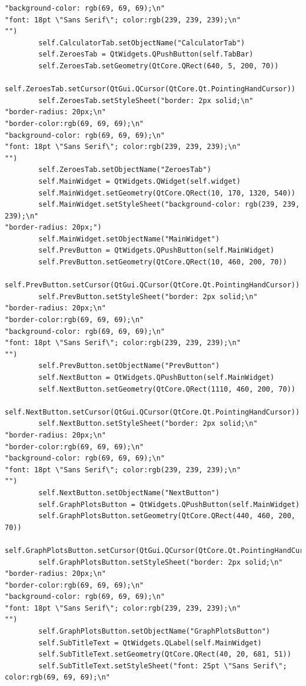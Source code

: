 \documentclass{article}
\begin{document}
\begin{lstlisting}
"background-color: rgb(69, 69, 69);\n"
"font: 18pt \"Sans Serif\"; color:rgb(239, 239, 239);\n"
"")
        self.CalculatorTab.setObjectName("CalculatorTab")
        self.ZeroesTab = QtWidgets.QPushButton(self.TabBar)
        self.ZeroesTab.setGeometry(QtCore.QRect(640, 5, 200, 70))
        self.ZeroesTab.setCursor(QtGui.QCursor(QtCore.Qt.PointingHandCursor))
        self.ZeroesTab.setStyleSheet("border: 2px solid;\n"
"border-radius: 20px;\n"
"border-color:rgb(69, 69, 69);\n"
"background-color: rgb(69, 69, 69);\n"
"font: 18pt \"Sans Serif\"; color:rgb(239, 239, 239);\n"
"")
        self.ZeroesTab.setObjectName("ZeroesTab")
        self.MainWidget = QtWidgets.QWidget(self.widget)
        self.MainWidget.setGeometry(QtCore.QRect(10, 170, 1320, 540))
        self.MainWidget.setStyleSheet("background-color: rgb(239, 239, 239);\n"
"border-radius: 20px;")
        self.MainWidget.setObjectName("MainWidget")
        self.PrevButton = QtWidgets.QPushButton(self.MainWidget)
        self.PrevButton.setGeometry(QtCore.QRect(10, 460, 200, 70))
        self.PrevButton.setCursor(QtGui.QCursor(QtCore.Qt.PointingHandCursor))
        self.PrevButton.setStyleSheet("border: 2px solid;\n"
"border-radius: 20px;\n"
"border-color:rgb(69, 69, 69);\n"
"background-color: rgb(69, 69, 69);\n"
"font: 18pt \"Sans Serif\"; color:rgb(239, 239, 239);\n"
"")
        self.PrevButton.setObjectName("PrevButton")
        self.NextButton = QtWidgets.QPushButton(self.MainWidget)
        self.NextButton.setGeometry(QtCore.QRect(1110, 460, 200, 70))
        self.NextButton.setCursor(QtGui.QCursor(QtCore.Qt.PointingHandCursor))
        self.NextButton.setStyleSheet("border: 2px solid;\n"
"border-radius: 20px;\n"
"border-color:rgb(69, 69, 69);\n"
"background-color: rgb(69, 69, 69);\n"
"font: 18pt \"Sans Serif\"; color:rgb(239, 239, 239);\n"
"")
        self.NextButton.setObjectName("NextButton")
        self.GraphPlotsButton = QtWidgets.QPushButton(self.MainWidget)
        self.GraphPlotsButton.setGeometry(QtCore.QRect(440, 460, 200, 70))
        self.GraphPlotsButton.setCursor(QtGui.QCursor(QtCore.Qt.PointingHandCursor))
        self.GraphPlotsButton.setStyleSheet("border: 2px solid;\n"
"border-radius: 20px;\n"
"border-color:rgb(69, 69, 69);\n"
"background-color: rgb(69, 69, 69);\n"
"font: 18pt \"Sans Serif\"; color:rgb(239, 239, 239);\n"
"")
        self.GraphPlotsButton.setObjectName("GraphPlotsButton")
        self.SubTitleText = QtWidgets.QLabel(self.MainWidget)
        self.SubTitleText.setGeometry(QtCore.QRect(40, 20, 681, 51))
        self.SubTitleText.setStyleSheet("font: 25pt \"Sans Serif\"; color:rgb(69, 69, 69);\n"

\end{lstlisting}
\end{document}
